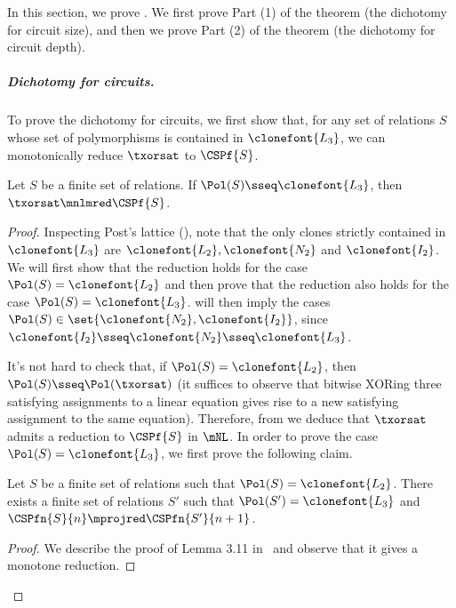 \documentclass[11pt]{article}
\begin{document}
In this section, we prove .
We first prove Part (1) of the theorem (the dichotomy for circuit size),
and then we prove Part (2) of the theorem (the dichotomy for circuit
depth).

\subparagraph{Dichotomy for circuits.}

To prove the dichotomy for circuits, 
we first show that, for
any set of relations $S$ whose set of polymorphisms is contained in $\clonefont{L_3}$,
we can monotonically reduce $\txorsat$ to $\CSPf{S}$.


\begin{lemma}
    \label{lem:l3_xorsat}
    Let $S$ be a finite set of relations.
    If 
    $\Pol(S) \sseq \clonefont{L_3}$,
    then
    $\txorsat \mnlmred \CSPf{S}$.
\end{lemma}
\begin{proof}
    Inspecting Post's lattice
    (),
    note that the only clones 
    strictly contained in
    $\clonefont{L_3}$ are
    $\clonefont{L_2}, \clonefont{N_2}$ and $\clonefont{I_2}$.
    We will first show that the reduction holds for the case
    $\Pol(S)=\clonefont{L_2}$ and then prove that 
    the reduction also holds for the case $\Pol(S)=\clonefont{L_3}$.
    will then imply the cases $\Pol(S) \in \set{\clonefont{N_2},\clonefont{I_2}}$, since
    $\clonefont{I_2} \sseq \clonefont{N_2} \sseq \clonefont{L_3}$.


    It's not hard to check that,
    if $\Pol(S) = \clonefont{L_2}$,
    then $\Pol(S) \sseq \Pol(\txorsat)$
    (it suffices to observe that bitwise XORing
    three satisfying assignments to a linear equation gives rise to 
    a new satisfying assignment to the same equation).
    Therefore, from  we deduce
    that $\txorsat$ admits a reduction to
    $\CSPf{S}$ in $\mNL$.
    In order to prove the case $\Pol(S) = \clonefont{L_3}$, we first prove the
    following claim.

    \begin{claim*}
        \label{lem:l2-to-l3}
        Let $S$ be a finite set of relations such that
        $\Pol(S) = \clonefont{L_2}$.
        There exists a finite set of relations $S'$
        such that
        $\Pol(S') = \clonefont{L_3}$
        and
        $\CSPfn{S}{n} \mprojred \CSPfn{S'}{n+1}$.
    \end{claim*}
    \begin{proof}
        We describe the proof of Lemma 3.11
        in~\cite{DBLP:journals/jcss/AllenderBISV09}
        and observe that it gives a monotone reduction.


\end{proof}
\end{proof}
\end{document}
